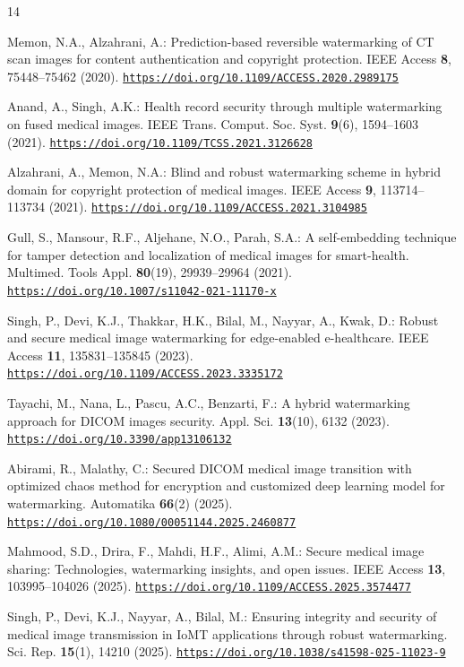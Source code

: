 \documentclass[runningheads]{llncs}
\newcommand{\doi}[1]{\mbox{\href{https://doi.org/#1}{\texttt{https://doi.org/#1}}}}
\begin{document}
\begin{thebibliography}{14}
\small
\setlength{\itemsep}{0pt}
\setlength{\parskip}{0pt}
\setlength{\parsep}{0pt}

Memon, N.A., Alzahrani, A.: Prediction-based reversible watermarking of CT
scan images for content authentication and copyright protection. IEEE Access \textbf{8},
75448--75462 (2020). \doi{10.1109/ACCESS.2020.2989175}

Anand, A., Singh, A.K.: Health record security through multiple watermarking
on fused medical images. IEEE Trans. Comput. Soc. Syst. \textbf{9}(6), 1594--1603 (2021).
\doi{10.1109/TCSS.2021.3126628}

Alzahrani, A., Memon, N.A.: Blind and robust watermarking scheme in hybrid
domain for copyright protection of medical images. IEEE Access \textbf{9}, 113714--113734
(2021). \doi{10.1109/ACCESS.2021.3104985}

Gull, S., Mansour, R.F., Aljehane, N.O., Parah, S.A.: A self-embedding
technique for tamper detection and localization of medical images for smart-health.
Multimed. Tools Appl. \textbf{80}(19), 29939--29964 (2021). \doi{10.1007/s11042-021-11170-x}

Singh, P., Devi, K.J., Thakkar, H.K., Bilal, M., Nayyar, A., Kwak, D.: Robust and
secure medical image watermarking for edge-enabled e-healthcare. IEEE Access \textbf{11},
135831--135845 (2023). \doi{10.1109/ACCESS.2023.3335172}

Tayachi, M., Nana, L., Pascu, A.C., Benzarti, F.: A hybrid watermarking approach
for DICOM images security. Appl. Sci. \textbf{13}(10), 6132 (2023). \doi{10.3390/app13106132}

Abirami, R., Malathy, C.: Secured DICOM medical image transition with optimized
chaos method for encryption and customized deep learning model for watermarking.
Automatika \textbf{66}(2) (2025). \doi{10.1080/00051144.2025.2460877}

Mahmood, S.D., Drira, F., Mahdi, H.F., Alimi, A.M.: Secure medical image sharing:
Technologies, watermarking insights, and open issues. IEEE Access \textbf{13},
103995--104026 (2025). \doi{10.1109/ACCESS.2025.3574477}

Singh, P., Devi, K.J., Nayyar, A., Bilal, M.: Ensuring integrity and security of
medical image transmission in IoMT applications through robust watermarking.
Sci. Rep. \textbf{15}(1), 14210 (2025). \doi{10.1038/s41598-025-11023-9}


\end{thebibliography}
\end{document}
